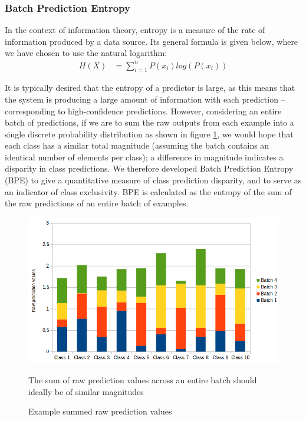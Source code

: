 \documentclass{report}
\begin{document}
\subsubsection{Batch Prediction Entropy}
In the context of information theory, entropy is a measure of the rate of information produced by a data source. Its general formula is given below, where we have chosen to use the natural logarithm:
\begin{align}
H(X) &= \sum_{i=1}^{n}P(x_i) log(P(x_i)) \label{entropyfunc}
\end{align}

It is typically desired that the entropy of a predictor is large, as this means that the system is producing a large amount of information with each prediction -- corresponding to high-confidence predictions. However, considering an entire batch of predictions, if we are to sum the raw outputs from each example into a single discrete probability distribution as shown in figure \ref{fig:totalbatchpredscores:1}, we would hope that each class has a similar total magnitude (assuming the batch contains an identical number of elements per class); a difference in magnitude indicates a disparity in class predictions. We therefore developed Batch Prediction Entropy (BPE) to give a quantitative measure of class prediction disparity, and to serve as an indicator of class exclusivity. BPE is calculated as the entropy of the sum of the raw predictions of an entire batch of examples. 

\begin{figure}[h!]
	\centering
	\includegraphics[width=13cm]{totalbatchpredscores}
	\caption{Example summed raw prediction values}
	The sum of raw prediction values across an entire batch should ideally be of similar magnitudes
	\label{fig:totalbatchpredscores:1}
\end{figure}
\end{document}
